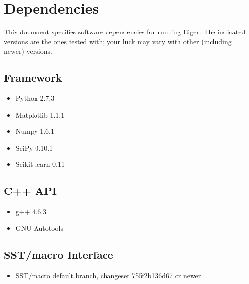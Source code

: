 \section{Dependencies}
\label{sec:dep}
This document specifies software dependencies for running Eiger. 
The indicated versions are the ones tested with; your luck may 
vary with other (including newer) versions.

\subsection{Framework}
\begin{itemize}
\item Python 2.7.3
\item Matplotlib 1.1.1
\item Numpy 1.6.1
\item SciPy 0.10.1
\item Scikit-learn 0.11
\end{itemize}

\subsection{C++ API}
\begin{itemize}
\item g++ 4.6.3
\item GNU Autotools
\end{itemize}

\subsection{SST/macro Interface}
\begin{itemize}
\item SST/macro default branch, changeset 755f2b136d67 or newer
\end{itemize}
